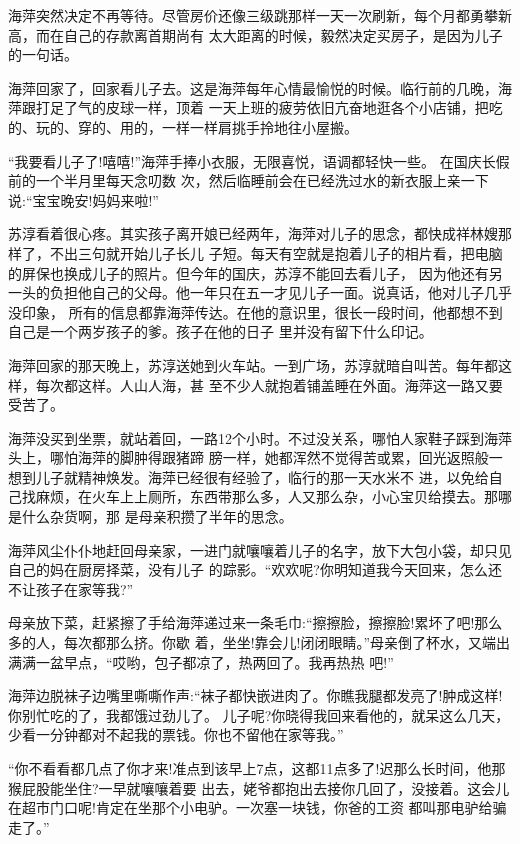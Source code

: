 \documentclass[11pt,a4paper,onecolumn]{article}
\begin{document}
海萍突然决定不再等待。尽管房价还像三级跳那样一天一次刷新，每个月都勇攀新高，而在自己的存款离首期尚有
太大距离的时候，毅然决定买房子，是因为儿子的一句话。

海萍回家了，回家看儿子去。这是海萍每年心情最愉悦的时候。临行前的几晚，海萍跟打足了气的皮球一样，顶着
一天上班的疲劳依旧亢奋地逛各个小店铺，把吃的、玩的、穿的、用的，一样一样肩挑手拎地往小屋搬。

``我要看儿子了!嘻嘻!''海萍手捧小衣服，无限喜悦，语调都轻快一些。 在国庆长假前的一个半月里每天念叨数
次，然后临睡前会在已经洗过水的新衣服上亲一下说:``宝宝晚安!妈妈来啦!''

苏淳看着很心疼。其实孩子离开娘已经两年，海萍对儿子的思念，都快成祥林嫂那样了，不出三句就开始儿子长儿
子短。每天有空就是抱着儿子的相片看，把电脑的屏保也换成儿子的照片。但今年的国庆，苏淳不能回去看儿子，
因为他还有另一头的负担\myrule 他自己的父母。他一年只在五一才见儿子一面。说真话，他对儿子几乎没印象，
所有的信息都靠海萍传达。在他的意识里，很长一段时间，他都想不到自己是一个两岁孩子的爹。孩子在他的日子
里并没有留下什么印记。

海萍回家的那天晚上，苏淳送她到火车站。一到广场，苏淳就暗自叫苦。每年都这样，每次都这样。人山人海，甚
至不少人就抱着铺盖睡在外面。海萍这一路又要受苦了。

海萍没买到坐票，就站着回，一路12个小时。不过没关系，哪怕人家鞋子踩到海萍头上，哪怕海萍的脚肿得跟猪蹄
膀一样，她都浑然不觉得苦或累，回光返照般一想到儿子就精神焕发。海萍已经很有经验了，临行的那一天水米不
进，以免给自己找麻烦，在火车上上厕所，东西带那么多，人又那么杂，小心宝贝给摸去。那哪是什么杂货啊，那
是母亲积攒了半年的思念。

海萍风尘仆仆地赶回母亲家，一进门就嚷嚷着儿子的名字，放下大包小袋，却只见自己的妈在厨房择菜，没有儿子
的踪影。``欢欢呢?你明知道我今天回来，怎么还不让孩子在家等我?''

母亲放下菜，赶紧擦了手给海萍递过来一条毛巾:``擦擦脸，擦擦脸!累坏了吧!那么多的人，每次都那么挤。你歇
着，坐坐!靠会儿!闭闭眼睛。''母亲倒了杯水，又端出满满一盆早点，``哎哟，包子都凉了，热两回了。我再热热
吧!''

海萍边脱袜子边嘴里嘶嘶作声:``袜子都快嵌进肉了。你瞧我腿都发亮了!肿成这样!你别忙吃的了，我都饿过劲儿了。
儿子呢?你晓得我回来看他的，就呆这么几天，少看一分钟都对不起我的票钱。你也不留他在家等我。''

``你不看看都几点了你才来!准点到该早上7点，这都11点多了!迟那么长时间，他那猴屁股能坐住?一早就嚷嚷着要
出去，姥爷都抱出去接你几回了，没接着。这会儿在超市门口呢!肯定在坐那个小电驴。一次塞一块钱，你爸的工资
都叫那电驴给骗走了。''
\end{document}

